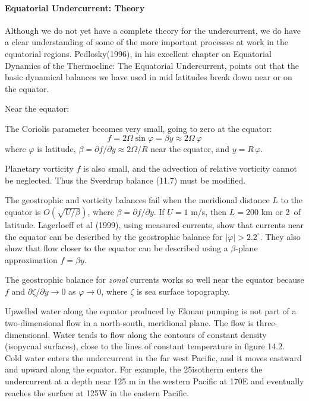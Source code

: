 \paragraph{Equatorial Undercurrent: Theory}
Although we do not yet
have a complete theory for the undercurrent, we do have a clear
understanding of some of the more important processes at work in the
equatorial regions. Pedlosky(1996), in his excellent chapter on
Equatorial Dynamics of the Thermocline: The Equatorial Undercurrent,
points out that the basic dynamical balances we have used in mid
latitudes break down near or on the equator.

Near the equator:
\begin{enumerate}
\vitem The Coriolis parameter
becomes very small, going to zero at the equator:
\begin{equation}
f=2\Omega \sin\varphi = \beta y \approx 2\Omega \,\varphi
\end{equation}
where $\varphi$ is latitude, $\beta = \partial f/\partial y \approx
2\Omega/R$ near the equator, and $y=R\,\varphi$.

\vitem Planetary vorticity $f$ is also small, and the advection of
relative vorticity cannot be neglected. Thus the Sverdrup balance
(11.7) must be modified.

\vitem The geostrophic
and vorticity balances fail when the meridional distance $L$ to the
equator is $O\left(\sqrt{U/\beta}\right)$, where
$\beta = \partial f / \partial y$.
If $U=1$ m/s, then $L=200$ km or 2\degrees\ of
latitude. Lagerloeff et al (1999), using measured currents, show that
currents near the equator can be described by the geostrophic
balance for
$|\varphi | > 2.2^{\circ}$. They also show that flow closer to the equator can be
described using a $\beta $-plane
approximation $f = \beta y$.

\vitem The geostrophic balance for \textit{zonal} currents works so
well near the equator because $f$ and $\partial \zeta/\partial y
\rightarrow 0$ as $\varphi \rightarrow 0$, where $\zeta$ is sea
surface topography.
\end{enumerate}
\vspace{-1.5ex}

Upwelled water along the equator produced by Ekman pumping is not part of a two-dimensional flow in a north-south,
meridional plane. The flow is three-dimensional. Water tends to flow
along the contours of constant density (isopycnal surfaces), close to
the lines of constant temperature in figure 14.2.  Cold water enters
the undercurrent in the far west Pacific, and it moves eastward and
upward along the equator. For example, the 25\degrees isotherm enters
the undercurrent at a depth near 125 m in the western Pacific at
170\degrees E and eventually reaches the surface at 125\degrees W in
the eastern Pacific.

